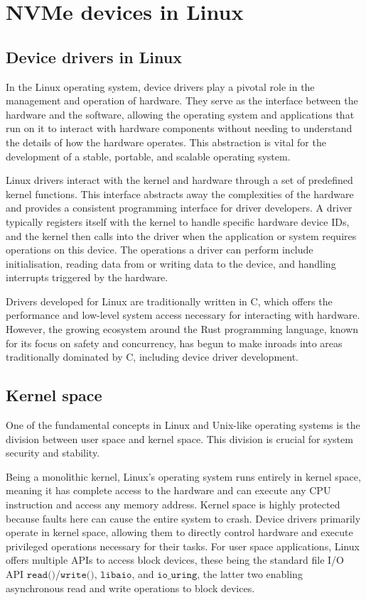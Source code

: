 \section{NVMe devices in Linux}

\subsection{Device drivers in Linux}
In the Linux operating system, device drivers play a pivotal role in the management and operation of hardware. They serve as the interface between the hardware and the software, allowing the operating system and applications that run on it to interact with hardware components without needing to understand the details of how the hardware operates. This abstraction is vital for the development of a stable, portable, and scalable operating system.

Linux drivers interact with the kernel and hardware through a set of predefined kernel functions. This interface abstracts away the complexities of the hardware and provides a consistent programming interface for driver developers. A driver typically registers itself with the kernel to handle specific hardware device IDs, and the kernel then calls into the driver when the application or system requires operations on this device. The operations a driver can perform include initialisation, reading data from or writing data to the device, and handling interrupts triggered by the hardware.

Drivers developed for Linux are traditionally written in C, which offers the performance and low-level system access necessary for interacting with hardware. However, the growing ecosystem around the Rust programming language, known for its focus on safety and concurrency, has begun to make inroads into areas traditionally dominated by C, including device driver development.


\subsection{Kernel space}
One of the fundamental concepts in Linux and Unix-like operating systems is the division between user space and kernel space. This division is crucial for system security and stability.

Being a monolithic kernel, Linux's operating system runs entirely in kernel space, meaning it has complete access to the hardware and can execute any CPU instruction and access any memory address. Kernel space is highly protected because faults here can cause the entire system to crash. Device drivers primarily operate in kernel space, allowing them to directly control hardware and execute privileged operations necessary for their tasks. For user space applications, Linux offers multiple APIs to access block devices, these being the standard file I/O API $\texttt{read()}$/$\texttt{write()}$, $\texttt{libaio}$, and $\texttt{io\_uring}$, the latter two enabling asynchronous read and write operations to block devices.

